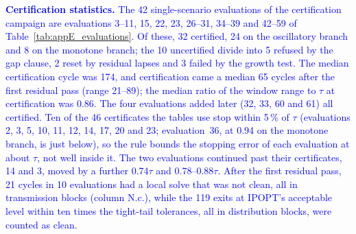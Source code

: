 \documentclass[preprint,12pt]{elsarticle}
\begin{document}
\textcolor{blue}{
    \textbf{Certification statistics.} The 42 single-scenario evaluations of the certification campaign are evaluations 3--11, 15, 22, 23, 26--31, 34--39 and 42--59 of Table~\ref{tab:appE_evaluations}. Of these, 32 certified, 24 on the oscillatory branch and 8 on the monotone branch; the 10 uncertified divide into 5 refused by the gap clause, 2 reset by residual lapses and 3 failed by the growth test. The median certification cycle was 174, and certification came a median 65 cycles after the first residual pass (range 21--89); the median ratio of the window range to $\tau$ at certification was 0.86. The four evaluations added later (32, 33, 60 and 61) all certified. Ten of the 46 certificates the tables use stop within 5\,\% of $\tau$ (evaluations 2, 3, 5, 10, 11, 12, 14, 17, 20 and 23; evaluation~36, at 0.94 on the monotone branch, is just below), so the rule bounds the stopping error of each evaluation at about $\tau$, not well inside it. The two evaluations continued past their certificates, 14 and 3, moved by a further 0.74$\tau$ and 0.78--0.88$\tau$. After the first residual pass, 21 cycles in 10 evaluations had a local solve that was not clean, all in transmission blocks (column N.c.), while the 119 exits at IPOPT's acceptable level within ten times the tight-tail tolerances, all in distribution blocks, were counted as clean.
}
\end{document}
